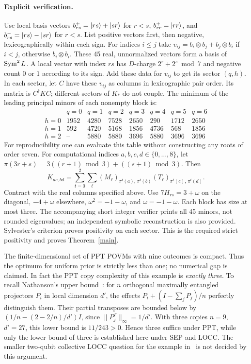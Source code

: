 \documentclass[10pt]{article}
\begin{document}
\paragraph{Explicit verification.}
Use local basis vectors $b_{rs}^+=|rs\rangle+|sr\rangle$ for $r<s$, $b_{rr}^+=|rr\rangle$, and $b_{rs}^-=|rs\rangle-|sr\rangle$ for $r<s$. List positive vectors first, then negative, lexicographically within each sign. For indices $i\le j$ take $v_{ij}=b_i\otimes b_j+b_j\otimes b_i$ if $i<j$, otherwise $b_i\otimes b_i$. These 45 real, unnormalized vectors form a basis of $\operatorname{Sym}^2 L$. A local vector with index $rs$ has $D$-charge $2^r+2^s\bmod 7$ and negative count $0$ or $1$ according to its sign. Add these data for $v_{ij}$ to get its sector $(q,h)$. In each sector, let $C$ have these $v_{ij}$ as columns in lexicographic pair order. Its matrix is $C^\dagger K C$; different sectors of $K_*$ do not couple. The minimum of the leading principal minors of each nonempty block is:
\[
\begin{array}{c|rrrrrrr}
 &q=0&q=1&q=2&q=3&q=4&q=5&q=6\\ \hline
 h=0&1952&4280&7528&2650&290&1712&2650\\
 h=1&592&4720&5168&1856&4736&568&1856\\
 h=2&\text{--}&5880&5880&3696&5880&3696&3696
\end{array}
\]
For reproducibility one can evaluate this table without constructing any roots of order seven. For computational indices $a,b,c,d\in\{0,\ldots,8\}$, let $\pi(3r+s)=3((r+1)\bmod3)+((s+1)\bmod3)$. Then
\[
     K_{ac,bd}=\sum_{t=0}^2\sum_\ell
       (M_\ell)_{\pi^t(a),\,\pi^t(b)}(T_\ell)_{\pi^t(c),\,\pi^t(d)} .
\]
Contract with the real columns specified above. Use $7H_{rs}=3+\omega$ on the diagonal, $-4+\omega$ elsewhere, $\omega^2=-1-\omega$, and $\bar\omega=-1-\omega$. Each block has size at most three. The accompanying short integer verifier prints all 45 minors, not rounded eigenvalues; an independent symbolic reconstruction is also provided. Sylvester's criterion proves positivity on each sector. This is the required strict positivity and proves Theorem~\ref{main}.

The finite-dimensional set of PPT POVMs with nine outcomes is compact. Thus the optimum for uniform prior is strictly less than one; no numerical gap is claimed. In fact the PPT copy complexity of this example is \emph{exactly three}. To recall Nathanson's upper bound~\cite[Thm.~4]{Nath}: for $n$ orthogonal maximally entangled projectors $P_i$ in local dimension $d'$, the effects $P_i+(I-\sum_jP_j)/n$ perfectly distinguish them. Their partial transposes are bounded below by $(1/n-(2-2/n)/d')I$, since $\|P_j^\Gamma\|_\infty=1/d'$. With three copies $n=9$, $d'=27$, this lower bound is $11/243>0$. Hence three suffice under PPT, while only the lower bound of three is established here under SEP and LOCC. The smaller two-qubit collective LOCC question for the example in~\cite{Watrous} is not decided by this argument.
\end{document}
